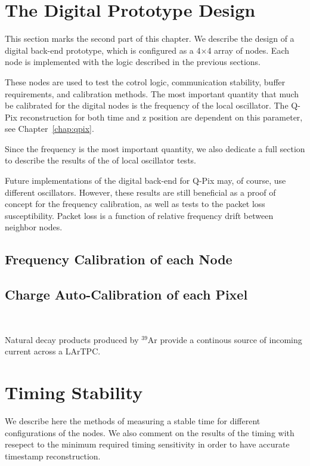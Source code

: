 \section{The Digital Prototype Design}

This section marks the second part of this chapter.
We describe the design of a digital back-end prototype, which is configured as a 4$\times$4 array of nodes.
Each node is implemented with the logic described in the previous sections.

These nodes are used to test the cotrol logic, communication stability, buffer requirements, and calibration methods.
The most important quantity that much be calibrated for the digital nodes is the frequency of the local oscillator.
The Q-Pix reconstruction for both time and z position are dependent on this parameter, see Chapter~\ref{chap:qpix}.

Since the frequency is the most important quantity, we also dedicate a full section to describe the results of the of local oscillator tests.

Future implementations of the digital back-end for Q-Pix may, of course, use different oscillators.
However, these results are still beneficial as a proof of concept for the frequency calibration, as well as tests to the packet loss susceptibility.
Packet loss is a function of relative frequency drift between neighbor nodes.

\subsection{Frequency Calibration of each Node}

\subsection{Charge Auto-Calibration of each Pixel}~\label{sec:charge_calibration}

Natural decay products produced by $^{39}$Ar provide a continous source of incoming current across a LArTPC.


\section{Timing Stability}

We describe here the methods of measuring a stable time for different configurations of the nodes.
We also comment on the results of the timing with resepect to the minimum required timing sensitivity in order to have accurate timestamp reconstruction.

